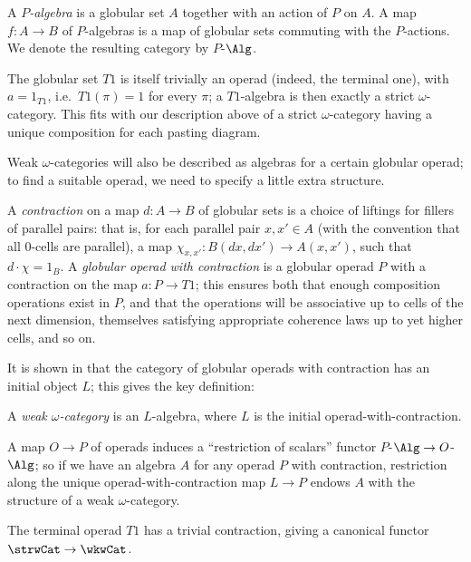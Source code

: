 A \emph{$P$-algebra} is a globular set $A$ together with an action of $P$ on $A$. A map $f\colon A \to B$ of $P$-algebras is a map of globular sets commuting with the $P$-actions.  We denote the resulting category by $P$-$\Alg$.

\begin{exa}The globular set $T1$ is itself trivially an operad (indeed, the terminal one), with $a = 1_{T1}$, i.e.\ $T1(\pi) = 1$ for every $\pi$; a $T1$-algebra is then exactly a strict $\omega$-category.  This fits with our description above of a strict $\omega$-category having a unique composition for each pasting diagram.  
\end{exa}

Weak $\omega$-categories will also be described as algebras for a certain globular operad; to find a suitable operad, we need to specify a little extra structure.

A \emph{contraction} on a map $d\colon  A \to B$ of globular sets is a choice of liftings for fillers of parallel pairs: that is, for each parallel pair $x,x' \in A$ (with the convention that all $0$-cells are parallel), a map $\chi_{x,x'}\colon  B(dx,dx') \to A(x,x')$, such that $d \cdot \chi = 1_B$. A \emph{globular operad with contraction} is a globular operad $P$ with a contraction on the map $a\colon  P \to T1$; this ensures both that enough composition operations exist in $P$, and that the operations will be associative up to cells of the next dimension, themselves satisfying appropriate coherence laws up to yet higher cells, and so on.

 It is shown in \cite{leinster:book} that the category of globular operads with contraction has an initial object $L$; this gives the key definition:

\begin{defi} A \emph{weak $\omega$-category} is an $L$-algebra, where $L$ is the initial operad-with-contraction.
\end{defi}

A map $O \to P$ of operads induces a ``restriction of scalars'' functor $P$-$\Alg \to O$-$\Alg$; so if we have an algebra $A$ for any operad $P$ with contraction, restriction along the unique operad-with-contraction map $L \to P$ endows $A$ with the structure of a weak $\omega$-category.

\begin{exa}
The terminal operad $T1$ has a trivial contraction, giving a canonical functor $\strwCat \to \wkwCat$.
\end{exa}

